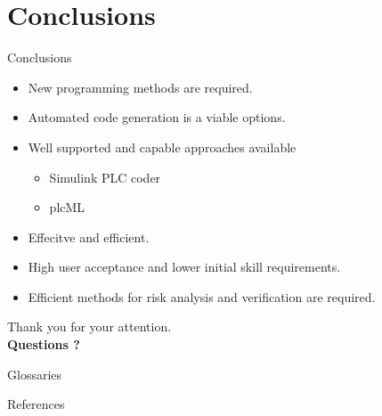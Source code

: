 \documentclass[18pt]{beamer}
\begin{document}
\section{Conclusions}
\begin{frame}{Conclusions}

\begin{itemize}
    \item New programming methods are required.
    \pause
    \item Automated code generation is a viable options.
    \pause
    \item Well supported and capable approaches available 
    \begin{itemize}
        \item Simulink PLC coder
        \item plcML
    \end{itemize}
    \pause
    \item Effecitve and efficient.
    \pause
    \item High user acceptance and lower initial skill requirements.
    \pause
    \item Efficient methods for risk analysis and verification are required.
\end{itemize}
\end{frame}

\begin{frame}
\vfill
\centering
{\LARGE Thank you for your attention.}\\
\vspace{1cm}
{\Large \textbf{Questions ?}}
\vfill
\end{frame}

\appendix
\beginbackup

\begin{frame}[allowframebreaks]{Glossaries}
\printglossaries
\end{frame}

\begin{frame}[allowframebreaks]{References}
\printbibliography
\end{frame}

\backupend
\end{document}
